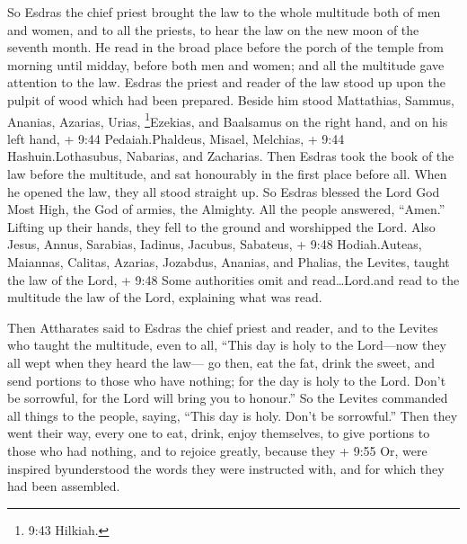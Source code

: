  So Esdras the chief priest brought the law to the whole
multitude both of men and women, and to all the priests, to hear the law
on the new moon of the seventh month.  He read in the broad
place before the porch of the temple from morning until midday, before
both men and women; and all the multitude gave attention to the law.
 Esdras the priest and reader of the law stood up upon the
pulpit of wood which had been prepared.  Beside him stood
Mattathias, Sammus, Ananias, Azarias, Urias, \footnote{9:43 Hilkiah.}Ezekias,
and Baalsamus on the right hand,  and on his left hand, +
9:44 Pedaiah.Phaldeus, Misael, Melchias, + 9:44 Hashuin.Lothasubus,
Nabarias, and Zacharias.  Then Esdras took the book of the
law before the multitude, and sat honourably in the first place before
all.  When he opened the law, they all stood straight up.
So Esdras blessed the Lord God Most High, the God of armies, the
Almighty.  All the people answered, ``Amen.'' Lifting up
their hands, they fell to the ground and worshipped the Lord.
 Also Jesus, Annus, Sarabias, Iadinus, Jacubus, Sabateus, +
9:48 Hodiah.Auteas, Maiannas, Calitas, Azarias, Jozabdus, Ananias, and
Phalias, the Levites, taught the law of the Lord, + 9:48 Some
authorities omit and read\ldots Lord.and read to the multitude the law
of the Lord, explaining what was read.

 Then Attharates said to Esdras the chief priest and
reader, and to the Levites who taught the multitude, even to all,
 ``This day is holy to the Lord---now they all wept when
they heard the law---  go then, eat the fat, drink the
sweet, and send portions to those who have nothing;  for
the day is holy to the Lord. Don't be sorrowful, for the Lord will bring
you to honour.''  So the Levites commanded all things to
the people, saying, ``This day is holy. Don't be sorrowful.''
 Then they went their way, every one to eat, drink, enjoy
themselves, to give portions to those who had nothing, and to rejoice
greatly,  because they + 9:55 Or, were inspired
byunderstood the words they were instructed with, and for which they had
been assembled.
